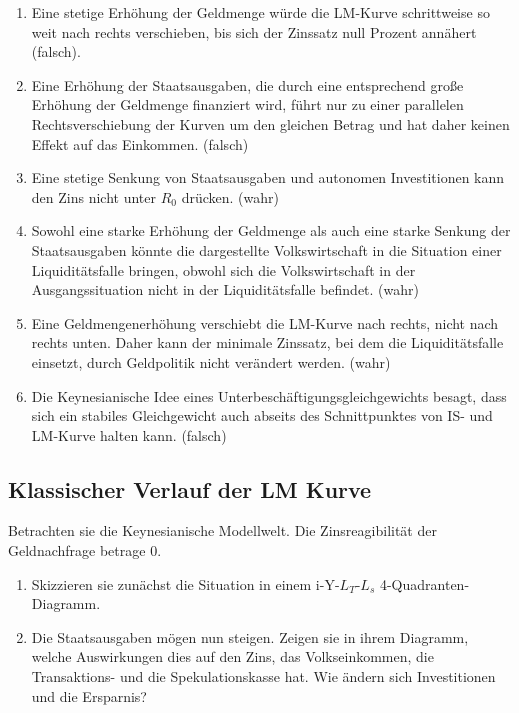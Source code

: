 \documentclass{scrartcl}
\begin{document}
\begin{enumerate}
	\item Eine stetige Erhöhung der Geldmenge würde die LM-Kurve schrittweise so weit nach rechts verschieben, bis sich der Zinssatz null Prozent annähert (falsch).
	\item Eine Erhöhung der Staatsausgaben, die durch eine entsprechend große Erhöhung der Geldmenge finanziert wird, führt nur zu einer parallelen Rechtsverschiebung der Kurven um den gleichen Betrag und hat daher keinen Effekt auf das Einkommen. (falsch)
	\item Eine stetige Senkung von Staatsausgaben und autonomen Investitionen kann den Zins nicht unter $R_0$ drücken. (wahr)
	\item Sowohl eine starke Erhöhung der Geldmenge als auch eine starke Senkung der Staatsausgaben könnte die dargestellte Volkswirtschaft in die Situation einer Liquiditätsfalle bringen, obwohl sich die Volkswirtschaft in der Ausgangssituation nicht in der Liquiditätsfalle befindet. (wahr)
	\item Eine Geldmengenerhöhung verschiebt die LM-Kurve nach rechts, nicht nach rechts unten. Daher kann der minimale Zinssatz, bei dem die Liquiditätsfalle einsetzt, durch Geldpolitik nicht verändert werden. (wahr)
	\item Die Keynesianische Idee eines Unterbeschäftigungsgleichgewichts besagt, dass sich ein stabiles Gleichgewicht auch abseits des Schnittpunktes von IS- und LM-Kurve halten kann. (falsch)
\end{enumerate}

\subsection{Klassischer Verlauf der LM Kurve}
Betrachten sie die Keynesianische Modellwelt. Die Zinsreagibilität der Geldnachfrage betrage 0.
\begin{enumerate}
	\item Skizzieren sie zunächst die Situation in einem i-Y-$L_T$-$L_s$ 4-Quadranten-Diagramm.
	\item Die Staatsausgaben mögen nun steigen. Zeigen sie in ihrem Diagramm, welche Auswirkungen dies auf den Zins, das Volkseinkommen, die Transaktions- und die Spekulationskasse hat. Wie ändern sich Investitionen und die Ersparnis?
\end{enumerate}
\end{document}
